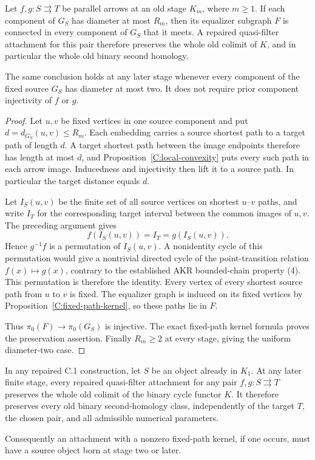 \begin{corollary}
\label{C:small-diameter-source}
Let $f,g:S\rightrightarrows T$ be parallel arrows at an old stage
$K_m$, where $m\geq1$.  If each component of $G_S$ has diameter at
most $R_m$, then its equalizer subgraph $F$ is connected in every
component of $G_S$ that it meets.  A repaired quasi-filter attachment
for this pair therefore preserves the whole old colimit of $K$,
and in particular the whole old binary second homology.

The same conclusion holds at any later stage whenever every
component of the fixed source $G_S$ has diameter at most two.
It does not require prior component injectivity of $f$ or $g$.
\end{corollary}

\begin{proof}
Let $u,v$ be fixed vertices in one source component and put
$d=d_{G_S}(u,v)\leq R_m$.  Each embedding carries a source shortest
path to a target path of length $d$.  A target shortest path between
the image endpoints therefore has length at most $d$, and
Proposition~\ref{C:local-convexity} puts every such path in each
arrow image.  Inducedness and injectivity then lift it to a source
path.  In particular the target distance equals $d$.

Let $I_S(u,v)$ be the finite set of all source vertices on shortest
$u$--$v$ paths, and write $I_T$ for the corresponding target interval
between the common images of $u,v$.  The preceding argument gives
\[
                         f(I_S(u,v))=I_T=g(I_S(u,v)).
\]
Hence $g^{-1}f$ is a permutation of $I_S(u,v)$.  A nonidentity
cycle of this permutation would give a nontrivial directed cycle
of the point-transition relation $f(x)\mapsto g(x)$, contrary to
the established AKR bounded-chain property (4).  This permutation
is therefore the identity.  Every vertex of every shortest source
path from $u$ to $v$ is fixed.  The equalizer graph is induced on
its fixed vertices by Proposition~\ref{C:fixed-path-kernel}, so
these paths lie in $F$.

Thus $\pi_0(F)\to\pi_0(G_S)$ is injective.  The exact fixed-path
kernel formula proves the preservation assertion.  Finally
$R_m\geq2$ at every stage, giving the uniform diameter-two case.
\end{proof}

\begin{theorem}
\label{C:first-stage-safe-sources}
In any repaired C.1 construction, let $S$ be an object already in
$K_1$.  At any later finite stage, every repaired quasi-filter
attachment for any pair $f,g:S\rightrightarrows T$ preserves the
whole old colimit of the binary cycle functor $K$.  It therefore
preserves every old binary second-homology class, independently of
the target $T$, the chosen pair, and all admissible numerical
parameters.

Consequently an attachment with a nonzero fixed-path kernel, if one
occurs, must have a source object born at stage two or later.
\end{theorem}

